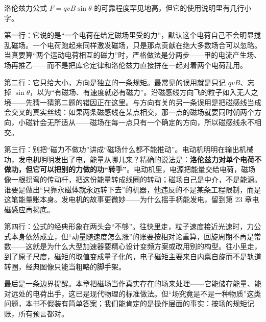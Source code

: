 \begin{mainline}
洛伦兹力公式 \(F=qvB\sin\theta\) 的可靠程度罕见地高，但它的使用说明里有几行小字。

第一行：它说的是“一个电荷在给定磁场里受的力”，默认这个电荷自己不会明显搅乱磁场。一个电荷跑起来同样激发磁场，只是那点贡献在绝大多数场合可以忽略。当真要算“两个运动电荷相互的磁力”时，严格做法是分两步——甲的电流产生场、场再推乙——而不是把库仑定律和洛伦兹力直接拼在一起对着两个电荷乱用。

第二行：它只给大小，方向是独立的一条规矩。最常见的误用就是只记 \(qvB\)、忘掉 \(\sin\theta\)，以为“有磁场、有速度就必有磁力”。沿磁感线方向飞的粒子如入无人之境——先猜一猜第二题的错因正在这里。与方向有关的另一条误用是把磁感线当成会交叉的真实丝线：如果两条磁感线在某点相交，那一点的磁场就要同时朝两个方向，小磁针会无所适从——磁场在每一点只有一个确定的方向，所以磁感线永不相交。

第三行：别把“磁力不做功”讲成“磁场什么都不能推动”。电动机明明在输出机械功，发电机明明发出了电，能量从哪儿来？精确的说法是：\textbf{洛伦兹力对单个电荷不做功，但它可以把别的力做的功“转手”}。电动机里，电源把能量交给电荷，磁场像一根拐弯的传动杆，把这份能量转成线圈的转动；磁场自己是中介，不是能源。谁要是做出“只靠永磁体就永远转下去”的机器，他违反的不是某条工程限制，而是这笔能量账本身。发电机的故事更微妙——为什么摇手柄能发电，留到第 23 章电磁感应再揭底。

第四行：公式的经典形象在两头会“不够”。往快里走，粒子速度接近光速时，力公式本身依然成立，但“动量随速度怎么涨”的账要按相对论重算，回旋周期不再是常数——这就是为什么大型加速器要精心设计变频方案或改用别的构型。往小里走，到了原子尺度，磁矩的取值变成量子化的，电子磁矩主要来自内禀自旋而不是轨道转圈，经典图像只能当粗略的脚手架。

最后是一条边界提醒。本章把磁场当作真实存在的场来处理——它能储存能量、能对远处的电荷出手，这已是现代物理的标准做法。但“场究竟是不是一种物质”这类问题，本书不假装有简单答案；我们能肯定的是操作层面的事实：按场的规矩记账，所有预言都对。
\end{mainline}


